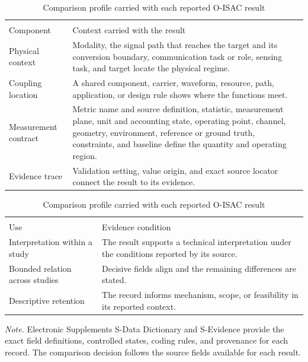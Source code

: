 \begin{table}[!htbp]
\caption{Comparison profile carried with each reported O-ISAC result}
\label{tab:comparison_record}
\centering
\footnotesize
\setlength{\tabcolsep}{3.2pt}
\renewcommand{\arraystretch}{1.04}
\begin{tabularx}{\columnwidth}{@{}>{\raggedright\arraybackslash}p{}
>{\raggedright\arraybackslash}X@{}}
\toprule
\multicolumn{2}{@{}l}{\emph{Comparison profile}} \\
\addlinespace[1pt]
Component & Context carried with the result \\
\midrule
Physical context & Modality, the signal path that reaches the target and its conversion boundary,
communication task or role, sensing task, and target locate the physical regime. \\
Coupling location & A shared component, carrier, waveform, resource, path,
application, or design rule shows where the functions meet. \\
Measurement contract & Metric name and source definition, statistic,
measurement plane, unit and accounting state, operating point, channel,
geometry, environment, reference or ground truth, constraints, and baseline
define the quantity and operating region. \\
Evidence trace & Validation setting, value origin, and exact source locator
connect the result to its evidence. \\
\bottomrule
\end{tabularx}

\vspace{3pt}
\begin{tabularx}{\columnwidth}{@{}>{\raggedright\arraybackslash}p{}
>{\raggedright\arraybackslash}X@{}}
\toprule
\multicolumn{2}{@{}l}{\emph{Analytical use}} \\
\addlinespace[1pt]
Use & Evidence condition \\
\midrule
Interpretation within a study & The result supports a technical interpretation
under the conditions reported by its source. \\
Bounded relation across studies & Decisive fields align and the remaining
differences are stated. \\
Descriptive retention & The record informs mechanism, scope, or feasibility in
its reported context. \\
\bottomrule
\end{tabularx}
\vspace{1pt}
\parbox{\columnwidth}{\footnotesize\emph{Note.} Electronic Supplements
S-Data Dictionary and S-Evidence provide the exact field definitions,
controlled states, coding rules, and provenance for each record. The comparison
decision follows the source fields available for each result.}
\end{table}

